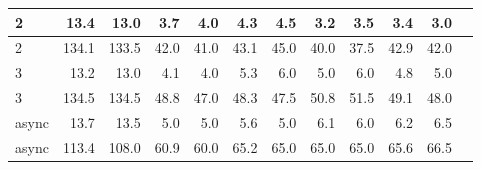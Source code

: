 \documentclass[12pt,a4paper]{report}
\begin{document}
\begin{table}[H]
\begin{tabular}{|l|r|r|r|r|r|r|r|r|r|r|r|}
		2                        & 13.4                           & 13.0                           & 3.7                           & 4.0                           & 4.3                             & 4.5  & 3.2  & 3.5  & 3.4  & 3.0  \\ \hline
		2                        & 134.1                          & 133.5                          & 42.0                          & 41.0                          & 43.1                            & 45.0 & 40.0 & 37.5 & 42.9 & 42.0 \\ \hline
		3                        & 13.2                           & 13.0                           & 4.1                           & 4.0                           & 5.3                             & 6.0  & 5.0  & 6.0  & 4.8  & 5.0  \\ \hline
		3                        & 134.5                          & 134.5                          & 48.8                          & 47.0                          & 48.3                            & 47.5 & 50.8 & 51.5 & 49.1 & 48.0 \\ \hline
		async                    & 13.7                           & 13.5                           & 5.0                           & 5.0                           & 5.6                             & 5.0  & 6.1  & 6.0  & 6.2  & 6.5  \\ \hline
		async                    & 113.4                          & 108.0                          & 60.9                          & 60.0                          & 65.2                            & 65.0 & 65.0 & 65.0 & 65.6 & 66.5 \\ \hline
	\end{tabular}
\end{table}
\end{document}
